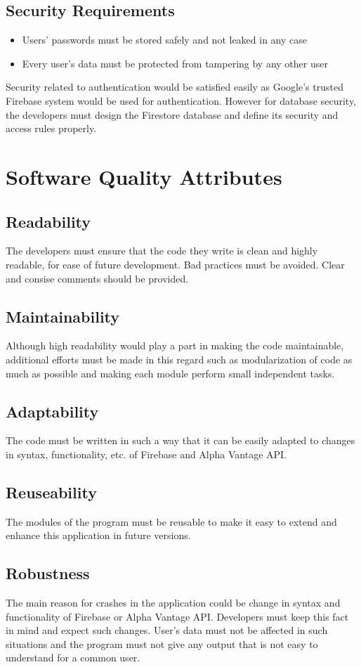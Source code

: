 \documentclass[12 pt, a4paper]{report}
\begin{document}
	\subsection{Security Requirements}
	\begin{itemize}
		\item Users' passwords must be stored safely and not leaked in any case
		\item Every user's data must be protected from tampering by any other user
	\end{itemize}
	Security related to authentication would be satisfied easily as Google's trusted Firebase system would be used for authentication. However for database security, the developers must design the Firestore database and define its security and access rules properly.
		
	\section {Software Quality Attributes}
	\subsection{Readability}
	The developers must ensure that the code they write is clean and highly readable, for ease of future development. Bad practices must be avoided. Clear and consise comments should be provided.
	\subsection{Maintainability}
	Although high readability would play a part in making the code maintainable, additional efforts must be made in this regard such as modularization of code as much as possible and making each module perform small independent tasks.
	\subsection{Adaptability}
	The code must be written in such a way that it can be easily adapted to changes in syntax, functionality, etc. of Firebase and Alpha Vantage API.
	\subsection{Reuseability}
	The modules of the program must be reusable to make it easy to extend and enhance this application in future versions.
	\subsection{Robustness}
	The main reason for crashes in the application could be change in syntax and functionality of Firebase or Alpha Vantage API. Developers must keep this fact in mind and expect such changes. User's data must not be affected in such situations and the program must not give any output that is not easy to understand for a common user.
\end{document}
